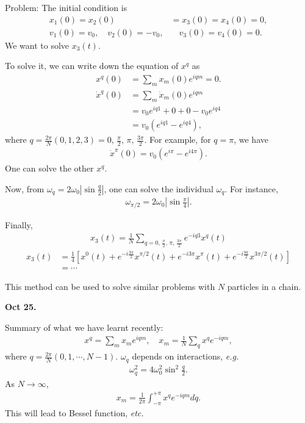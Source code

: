 Problem: 
The initial condition is 
\begin{align}
x_1(0)= x_2(0)&= x_3(0)=x_4(0)=0,\\
v_1(0)=v_0, \quad  v_2(0)=-v_0, &\quad v_3(0)=v_4(0)=0.
\end{align}
We want to solve $ x_3(t) $. 

To solve it, we can write down the equation of $ x^q $ as
\begin{align}
x^q(0)&= \sum_m x_m(0) e^{iqm}=0.\\
\dot{x}^q(0) &=\sum_m \dot{x}_m (0) e^{iqm}\nonumber \\
&= v_0 e^{iq1}+ 0+0-v_0 e^{iq4}\\
&= v_0(e^{iq1}-e^{iq4}),
\end{align}
where $ q=\frac{2\pi}{N}(0,1,2,3)=0,\,\frac{\pi}{2},\,\pi,\,\frac{3\pi}{2} $. For example, for $ q=\pi $, we have
\begin{align}
\dot{x} ^\pi (0)=v_0 (e^{i\pi}-e^{i4\pi}).
\end{align}
One can solve the other $ x^q $.

Now, from $ \omega_q= 2\omega_0 \left|\sin\frac{q}{2} \right| $, one can solve the individual $ \omega_q $. For instance, 
\begin{align}
\omega_{\pi/2}= 2\omega_0 \left|\sin\frac{\pi}{4} \right|.
\end{align}

Finally, 
\begin{align}
x_3(t)=\frac{1}{N} \sum_{q=0,\,\frac{\pi}{2},\,\pi,\,\frac{3\pi}{2} } e^{-iq3}x^q(t)
\end{align}
\begin{align}
x_3(t) &= \frac{1}{4}\left[x^0 (t)+e^{-i\frac{3\pi}{2}}x^{\pi/2}(t) + e^{-i3\pi}x^\pi (t) + e^{-i\frac{9\pi}{2}}x^{3\pi/2}(t) \right]\\
&= \cdots
\end{align}

This method can be used to solve similar problems with $ N $ particles in a chain. 

\textbf{Oct 25.}


Summary of what we have learnt recently:
\begin{align}
x^q=\sum_m x_m e^{iqm},\quad x_m=\frac{1}{N}\sum_q x^q e^{-iqm},
\end{align}
where $ q=\frac{2\pi}{N}(0,1,\cdots,N-1) $.
$ \omega_q $ depends on interactions, \textit{e.g.} 
\begin{align}
\omega_q^2=4\omega_0^2 \sin^2 \frac{q}{2}.
\end{align}
As $ N\rightarrow \infty $,
\begin{align}
x_m=\frac{1}{2\pi} \int_{-\pi}^{+\pi} x^q e^{-iqm} dq.
\end{align}
This will lead to Bessel function, \textit{etc.} 

